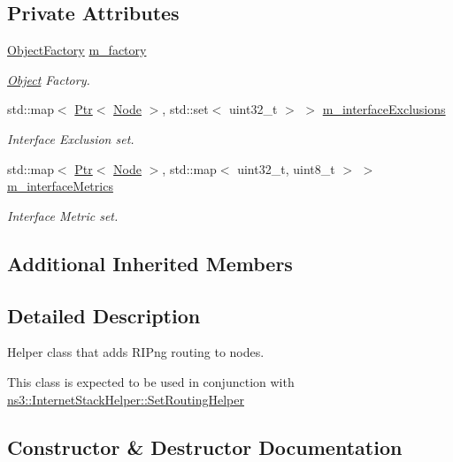 \subsection*{Private Attributes}
\begin{DoxyCompactItemize}
\item 
\hyperlink{classns3_1_1ObjectFactory}{Object\+Factory} \hyperlink{classns3_1_1RipNgHelper_aeb080c1cf7508c5d719fcf5cc28dab84}{m\+\_\+factory}
\begin{DoxyCompactList}\small\item\em \hyperlink{classns3_1_1Object}{Object} Factory. \end{DoxyCompactList}\item 
std\+::map$<$ \hyperlink{classns3_1_1Ptr}{Ptr}$<$ \hyperlink{classns3_1_1Node}{Node} $>$, std\+::set$<$ uint32\+\_\+t $>$ $>$ \hyperlink{classns3_1_1RipNgHelper_a162dcae91127b3ef1bf3af24c1708ba2}{m\+\_\+interface\+Exclusions}
\begin{DoxyCompactList}\small\item\em Interface Exclusion set. \end{DoxyCompactList}\item 
std\+::map$<$ \hyperlink{classns3_1_1Ptr}{Ptr}$<$ \hyperlink{classns3_1_1Node}{Node} $>$, std\+::map$<$ uint32\+\_\+t, uint8\+\_\+t $>$ $>$ \hyperlink{classns3_1_1RipNgHelper_a290cfef7a9bed83564de3fd950b8f6cd}{m\+\_\+interface\+Metrics}
\begin{DoxyCompactList}\small\item\em Interface Metric set. \end{DoxyCompactList}\end{DoxyCompactItemize}
\subsection*{Additional Inherited Members}


\subsection{Detailed Description}
Helper class that adds R\+I\+Png routing to nodes. 

This class is expected to be used in conjunction with \hyperlink{classns3_1_1InternetStackHelper_a3e382c02df022dec79952a7eca8cd5ba}{ns3\+::\+Internet\+Stack\+Helper\+::\+Set\+Routing\+Helper} 

\subsection{Constructor \& Destructor Documentation}
